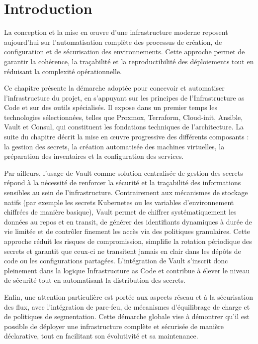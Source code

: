 \section{Introduction}

La conception et la mise en œuvre d’une infrastructure moderne reposent aujourd’hui sur l’automatisation complète des processus de création, de configuration et de sécurisation des environnements. Cette approche permet de garantir la cohérence, la traçabilité et la reproductibilité des déploiements tout en réduisant la complexité opérationnelle.

Ce chapitre présente la démarche adoptée pour concevoir et automatiser l’infrastructure du projet, en s’appuyant sur les principes de l’Infrastructure as Code et sur des outils spécialisés. Il expose dans un premier temps les technologies sélectionnées, telles que Proxmox, Terraform, Cloud-init, Ansible, Vault et Consul, qui constituent les fondations techniques de l’architecture. La suite du chapitre décrit la mise en œuvre progressive des différents composants : la gestion des secrets, la création automatisée des machines virtuelles, la préparation des inventaires et la configuration des services.

Par ailleurs, l’usage de Vault comme solution centralisée de gestion des secrets répond à la nécessité de renforcer la sécurité et la traçabilité des informations sensibles au sein de l’infrastructure. Contrairement aux mécanismes de stockage natifs (par exemple les secrets Kubernetes ou les variables d’environnement chiffrées de manière basique), Vault permet de chiffrer systématiquement les données au repos et en transit, de générer des identifiants dynamiques à durée de vie limitée et de contrôler finement les accès via des politiques granulaires. Cette approche réduit les risques de compromission, simplifie la rotation périodique des secrets et garantit que ceux-ci ne transitent jamais en clair dans les dépôts de code ou les configurations partagées. L’intégration de Vault s’inscrit donc pleinement dans la logique Infrastructure as Code et contribue à élever le niveau de sécurité tout en automatisant la distribution des secrets.

Enfin, une attention particulière est portée aux aspects réseau et à la sécurisation des flux, avec l’intégration de pare-feu, de mécanismes d’équilibrage de charge et de politiques de segmentation. Cette démarche globale vise à démontrer qu’il est possible de déployer une infrastructure complète et sécurisée de manière déclarative, tout en facilitant son évolutivité et sa maintenance.
